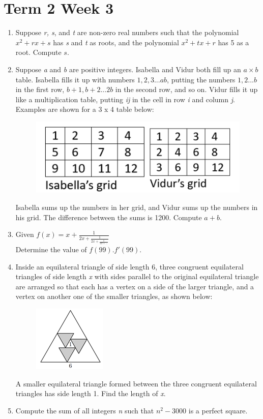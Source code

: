 \documentclass[../main.tex]{subfiles}
\begin{document}
\section*{Term 2 Week 3}
\begin{enumerate}
    \item 
    Suppose \textit{r, s}, and \textit{t} are non-zero real numbers such that the polynomial \(x^2+rx+s\) has \textit{s} and \textit{t} as roots, and the polynomial \(x^2+tx+r\) has 5 as a root. Compute \(s\).\\

    \item 
    Suppose \textit{a} and \textit{b} are positive integers. Isabella and Vidur both fill up an \(a\times b\) table. Isabella fills it up with numbers \(1,2,3...ab\), putting the numbers \(1,2...b\) in the first row, \(b+1, b+2...2b\) in the second row, and so on. Vidur fills it up like a multiplication table, putting \textit{ij} in the cell in row \textit{i} and column \textit{j}.\\
    
    Examples are shown for a 3 x 4 table below:
    \begin{figure}[H]
        \centering
        \includegraphics[width=0.3\linewidth]{images/t2w3q2.png}
    \end{figure}
    Isabella sums up the numbers in her grid, and Vidur sums up the numbers in his grid. The difference between the sums is 1200. Compute \(a+b\).\\
    
    \item 
    Given \(f(x)=x+\frac{1}{2x+\frac{1}{2x+\frac{1}{2x+...}}}\)\\

    Determine the value of \(f(99).f'(99)\).\\

    \item 
    Inside an equilateral triangle of side length 6, three congruent equilateral triangles of side length \textit{x} with sides parallel to the original equilateral triangle are arranged so that each has a vertex on a side of the larger triangle, and a vertex on another one of the smaller triangles, as shown below:\\
    \begin{figure}[H]
        \centering
        \includegraphics{images/t2w3q4.png}
    \end{figure}
    A smaller equilateral triangle formed between the three congruent equilateral triangles has side length 1. Find the length of \textit{x}.\\

    \item 
    Compute the sum of all integers \textit{n} such that \(n^2-3000\) is a perfect square.

    
\end{enumerate}
\end{document}
